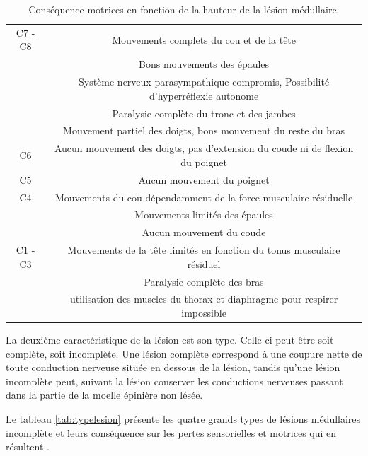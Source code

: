 \documentclass[letterpaper, twoside, 12pt, memoire, creativecommons, hyperref]{thETS}
\begin{document}
\begin{table}[ht]
	\caption{Conséquence motrices en fonction de la hauteur de la lésion médullaire.}
		\begin{tabular}{|c|c|}
		\hline
	    	 	C7 - C8 & Mouvements complets du cou et de la tête \\
	    	 	& Bons mouvements des épaules\\
	    	 	& Système nerveux parasympathique compromis, Possibilité d'hyperréflexie autonome\\
	    	 	& Paralysie complète du tronc et des jambes\\
	    	 	& Mouvement partiel des doigts, bons mouvement du reste du bras\\
	    \hline
	    	 	C6 & Aucun mouvement des doigts, pas d'extension du coude ni de flexion du poignet\\
	    \hline
	    		C5 & Aucun mouvement du poignet\\
	    	\hline
	    		C4 & Mouvements du cou dépendamment de la force musculaire résiduelle \\
	    		& Mouvements limités des épaules\\
	    		& Aucun mouvement du coude\\
		\hline
			C1 - C3 & Mouvements de la tête limités en fonction du tonus musculaire résiduel\\
			 & Paralysie complète des bras\\
			 & utilisation des muscles du thorax et diaphragme pour respirer impossible\\	    
	    \hline
		\end{tabular}
	\label{tab:hauteurlesion}
\end{table}

La deuxième caractéristique de la lésion est son type. Celle-ci peut être soit complète, soit incomplète. Une lésion complète correspond à une coupure nette de toute conduction nerveuse située en dessous de la lésion, tandis qu'une lésion incomplète peut, suivant la lésion conserver les conductions nerveuses passant dans la partie de la moelle épinière non lésée.

Le tableau \ref{tab:typelesion} présente les quatre grands types de lésions médullaires incomplète et leurs conséquence sur les pertes sensorielles et motrices qui en résultent \citep{apparelyzed2008}.
\end{document}
